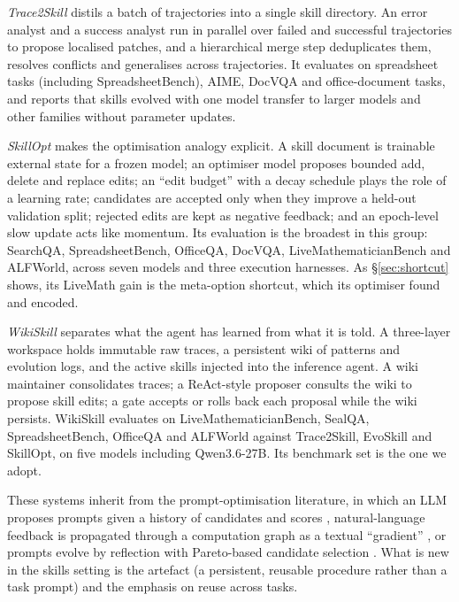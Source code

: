 \documentclass[11pt]{article}
\begin{document}
\emph{Trace2Skill} \citep{ni2026trace2skill} distils a batch of trajectories into a single skill
directory. An error analyst and a success analyst run in parallel over failed and successful
trajectories to propose localised patches, and a hierarchical merge step deduplicates them, resolves
conflicts and generalises across trajectories. It evaluates on spreadsheet tasks (including
SpreadsheetBench), AIME, DocVQA and office-document tasks, and reports that skills evolved with one
model transfer to larger models and other families without parameter updates.

\emph{SkillOpt} \citep{yang2026skillopt} makes the optimisation analogy explicit. A skill document is
trainable external state for a frozen model; an optimiser model proposes bounded add, delete and
replace edits; an ``edit budget'' with a decay schedule plays the role of a learning rate;
candidates are accepted only when they improve a held-out validation split; rejected edits are kept
as negative feedback; and an epoch-level slow update acts like momentum. Its evaluation is the
broadest in this group: SearchQA, SpreadsheetBench, OfficeQA, DocVQA, LiveMathematicianBench and
ALFWorld, across seven models and three execution harnesses. As \S\ref{sec:shortcut} shows, its
LiveMath gain is the meta-option shortcut, which its optimiser found and encoded.

\emph{WikiSkill} \citep{tang2026wikiskill} separates what the agent has learned from what it is
told. A three-layer workspace holds immutable raw traces, a persistent wiki of patterns and
evolution logs, and the active skills injected into the inference agent. A wiki maintainer
consolidates traces; a ReAct-style proposer consults the wiki to propose skill edits; a gate accepts
or rolls back each proposal while the wiki persists. WikiSkill evaluates on LiveMathematicianBench,
SealQA, SpreadsheetBench, OfficeQA and ALFWorld against Trace2Skill, EvoSkill and SkillOpt, on five
models including Qwen3.6-27B. Its benchmark set is the one we adopt.

These systems inherit from the prompt-optimisation literature, in which an LLM proposes prompts
given a history of candidates and scores \citep{yang2024opro}, natural-language feedback is
propagated through a computation graph as a textual ``gradient'' \citep{yuksekgonul2024textgrad}, or
prompts evolve by reflection with Pareto-based candidate selection \citep{agrawal2025gepa}. What is
new in the skills setting is the artefact (a persistent, reusable procedure rather than a task
prompt) and the emphasis on reuse across tasks.
\end{document}
